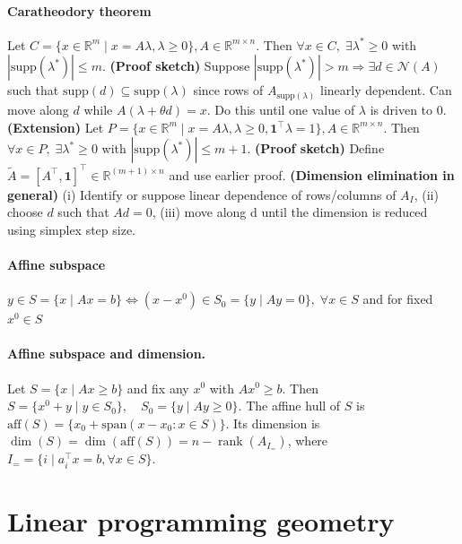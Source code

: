 \documentclass{article}
\begin{document}
\paragraph{Caratheodory theorem} Let $C = \{x\in \mathbb R^m \mid x = A\lambda, \lambda \geq 0\}, A\in \mathbb R^{m\times n}$. Then $\forall x\in C,\; \exists \lambda^*\geq0$ with $|\text{supp}(\lambda^*)|\leq m$. \textbf{(Proof sketch)} Suppose $|\text{supp}(\lambda^*)|> m \Longrightarrow \exists d\in \mathcal N(A)$ such that $\text{supp}(d)\subseteq \text{supp}(\lambda)$ since rows of $A_{\text{supp}(\lambda)}$ linearly dependent. Can move along $d$ while $A(\lambda + \theta d) = x$. Do this until one value of $\lambda$ is driven to 0. \textbf{(Extension)} Let $P = \{x\in \mathbb R^m \mid x = A\lambda, \lambda \geq 0, \mathbf{1}^\top \lambda = 1\}, A\in \mathbb R^{m\times n}$. Then $\forall x\in P,\; \exists \lambda^*\geq0$ with $|\text{supp}(\lambda^*)|\leq m+1$. \textbf{(Proof sketch)} Define $\tilde A = [A^\top , \mathbf{1}]^\top  \in \mathbb R^{(m+1)\times n}$ and use earlier proof. \textbf{(Dimension elimination in general)} (i) Identify or suppose linear dependence of rows/columns of $A_I$, (ii) choose $d$ such that $Ad = 0$, (iii) move along d until the dimension is reduced using simplex step size.

\paragraph{Affine subspace} $y \in S = \{x \mid Ax=b\} \iff (x - x^0) \in S_0 = \{y \mid Ay = 0\},\; \forall x\in S$ and for fixed $x^0\in S$

\paragraph{Affine subspace and dimension.}
Let $S = \{x \mid A x \geq b\}$ and fix any $x^0$ with $A x^0 \geq b$. Then $S = \{x^0 + y \mid y \in S_0\}, \quad S_0 = \{y \mid A y \geq 0\}$.
The affine hull of $S$ is $\text{aff}(S) = \{x_0 + \text{span}(x - x_0 : x \in S)\}$. Its dimension is $\dim(S) = \dim(\text{aff}(S)) = n - \operatorname{rank}(A_{I_=})$, where $I_= = \{i\mid a_i^\top x = b, \forall x\in S\}$.


\section{Linear programming geometry}
\end{document}
